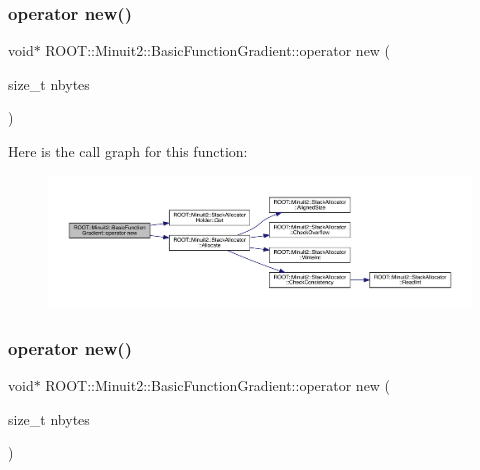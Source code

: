 \subsubsection{\texorpdfstring{operator new()}{operator new()}\hspace{0.1cm}{\footnotesize\ttfamily [1/3]}}
{\footnotesize\ttfamily void$\ast$ R\+O\+O\+T\+::\+Minuit2\+::\+Basic\+Function\+Gradient\+::operator new (\begin{DoxyParamCaption}\item[{size\+\_\+t}]{nbytes }\end{DoxyParamCaption})\hspace{0.3cm}{\ttfamily [inline]}}

Here is the call graph for this function\+:
\nopagebreak
\begin{figure}[H]
\begin{center}
\leavevmode
\includegraphics[width=350pt]{db/d85/classROOT_1_1Minuit2_1_1BasicFunctionGradient_a2b08ebb0074a43cfca91f74991c660d5_cgraph}
\end{center}
\end{figure}
\mbox{\label{classROOT_1_1Minuit2_1_1BasicFunctionGradient_a2b08ebb0074a43cfca91f74991c660d5}} 
\subsubsection{\texorpdfstring{operator new()}{operator new()}\hspace{0.1cm}{\footnotesize\ttfamily [2/3]}}
{\footnotesize\ttfamily void$\ast$ R\+O\+O\+T\+::\+Minuit2\+::\+Basic\+Function\+Gradient\+::operator new (\begin{DoxyParamCaption}\item[{size\+\_\+t}]{nbytes }\end{DoxyParamCaption})\hspace{0.3cm}{\ttfamily [inline]}}

